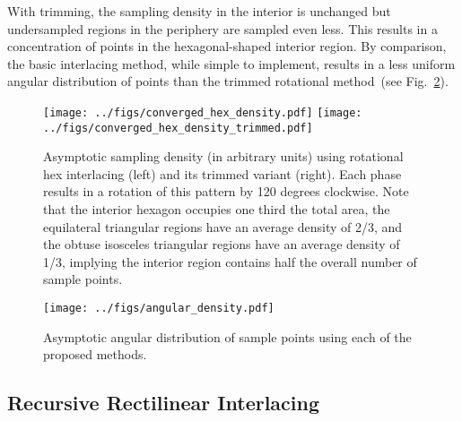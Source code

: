 \documentclass{article}
\newcommand{\reffig}[1]{Fig.~\ref{fig:#1}}
\begin{document}
%
With trimming, the sampling density in the interior is unchanged but undersampled regions in the periphery are sampled even less.
%
This results in a concentration of points in the hexagonal-shaped interior region.
%
%
By comparison, the basic interlacing method, while simple to implement, results in a less uniform angular distribution of points than the trimmed rotational method~(see \reffig{angdens}).

\begin{figure}[ht]
\centering
\texttt{[image: ../figs/converged\_hex\_density.pdf]}
\texttt{[image: ../figs/converged\_hex\_density\_trimmed.pdf]}
\caption{
\label{fig:hexdensity}
	Asymptotic sampling density (in arbitrary units) using rotational hex interlacing (left) and its trimmed variant (right).
%
Each phase results in a rotation of this pattern by 120 degrees clockwise.
%
%
Note that the interior hexagon occupies one third the total area, the equilateral triangular regions have an average density of 2/3, and the obtuse isosceles triangular regions have an average density of 1/3, implying the interior region contains half the overall number of sample points.
}
\end{figure}


\begin{figure}
\centering
\texttt{[image: ../figs/angular\_density.pdf]}
\caption{
\label{fig:angdens} 
	Asymptotic angular distribution of sample points using each of the proposed methods.
}
\end{figure}

\subsection{Recursive Rectilinear Interlacing}
\label{sec:recursive}
\end{document}
